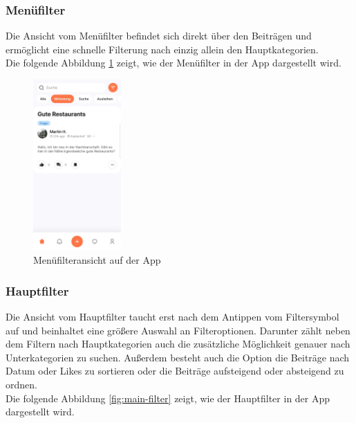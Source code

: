 \subsubsection{Menüfilter}

Die Ansicht vom Menüfilter befindet sich direkt über den Beiträgen und ermöglicht eine schnelle Filterung nach einzig allein den Hauptkategorien.
\\
Die folgende Abbildung \ref{fig:menu-filter} zeigt, wie der Menüfilter in der App dargestellt wird.

\begin{figure}[h]
  \centering
  \includegraphics[width=0.3\textwidth]{pics/menu-filter.jpg}
  \caption{Menüfilteransicht auf der App}
  \label{fig:menu-filter}
\end{figure}

\subsubsection{Hauptfilter}

Die Ansicht vom Hauptfilter taucht erst nach dem Antippen vom Filtersymbol auf und beinhaltet eine größere Auswahl an Filteroptionen. Darunter zählt neben dem Filtern nach Hauptkategorien auch die zusätzliche Möglichkeit genauer nach Unterkategorien zu suchen. Außerdem besteht auch die Option die Beiträge nach Datum oder Likes zu sortieren oder die Beiträge aufsteigend oder absteigend zu ordnen.
\\
Die folgende Abbildung \ref{fig:main-filter} zeigt, wie der Hauptfilter in der App dargestellt wird.

